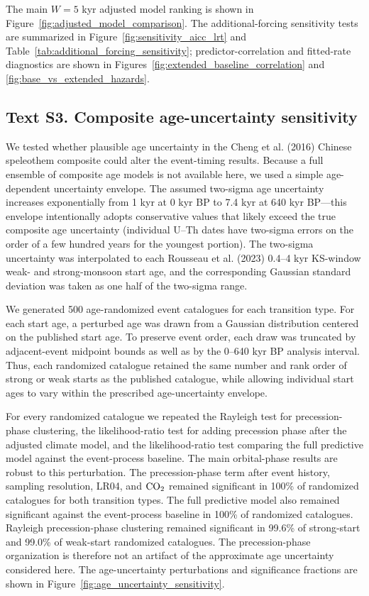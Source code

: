 \documentclass[11pt]{article}
\begin{document}
The main \(W=5\) kyr adjusted model ranking is shown in Figure~\ref{fig:adjusted_model_comparison}. The additional-forcing sensitivity tests are summarized in Figure~\ref{fig:sensitivity_aicc_lrt} and Table~\ref{tab:additional_forcing_sensitivity}; predictor-correlation and fitted-rate diagnostics are shown in Figures~\ref{fig:extended_baseline_correlation} and \ref{fig:base_vs_extended_hazards}.


\subsection*{Text S3. Composite age-uncertainty sensitivity}

We tested whether plausible age uncertainty in the Cheng et al. (2016) Chinese speleothem composite could alter the event-timing results. Because a full ensemble of composite age models is not available here, we used a simple age-dependent uncertainty envelope. The assumed two-sigma age uncertainty increases exponentially from 1 kyr at 0 kyr BP to 7.4 kyr at 640 kyr BP---this envelope intentionally adopts conservative values that likely exceed the true composite age uncertainty (individual U--Th dates have two-sigma errors on the order of a few hundred years for the youngest portion). The two-sigma uncertainty was interpolated to each Rousseau et al. (2023) 0.4--4 kyr KS-window weak- and strong-monsoon start age, and the corresponding Gaussian standard deviation was taken as one half of the two-sigma range.

We generated 500 age-randomized event catalogues for each transition type. For each start age, a perturbed age was drawn from a Gaussian distribution centered on the published start age. To preserve event order, each draw was truncated by adjacent-event midpoint bounds as well as by the 0--640 kyr BP analysis interval. Thus, each randomized catalogue retained the same number and rank order of strong or weak starts as the published catalogue, while allowing individual start ages to vary within the prescribed age-uncertainty envelope.

For every randomized catalogue we repeated the Rayleigh test for precession-phase clustering, the likelihood-ratio test for adding precession phase after the adjusted climate model, and the likelihood-ratio test comparing the full predictive model against the event-process baseline. The main orbital-phase results are robust to this perturbation. The precession-phase term after event history, sampling resolution, LR04, and \(\ce{CO2}\) remained significant in 100\% of randomized catalogues for both transition types. The full predictive model also remained significant against the event-process baseline in 100\% of randomized catalogues. Rayleigh precession-phase clustering remained significant in 99.6\% of strong-start and 99.0\% of weak-start randomized catalogues. The precession-phase organization is therefore not an artifact of the approximate age uncertainty considered here. The age-uncertainty perturbations and significance fractions are shown in Figure~\ref{fig:age_uncertainty_sensitivity}.
\end{document}
